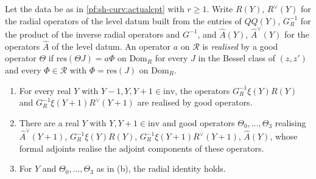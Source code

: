 \begin{proposition}\label{pf:sh-curv:spec}
Let the data be as in \cref{pf:sh-curv:actualcpt} with $r\ge1$. Write $R(Y)$, $R^\vee(Y)$ for the radial operators of the
level datum built from the entries of $QQ(Y)$, $G_R^{-1}$ for the product of the inverse radial operators and $G^{-1}$, and
$\widehat A(Y)$, $\widehat A^\vee(Y)$ for the operators $\widehat A$ of the level datum. An operator $a$ on $\mathcal R$ is
\emph{realised} by a good operator $\Theta$ if $\mathrm{res}(\Theta J)=a\Phi$ on $\mathrm{Dom}_R$ for every $J$ in the Bessel
class of $(z,z')$ and every $\Phi\in\mathcal R$ with $\Phi=\mathrm{res}(J)$ on $\mathrm{Dom}_R$.
\begin{enumerate}[label=(\alph*)]
\item For every real $Y$ with $Y-1,Y,Y+1\in\mathrm{inv}$, the operators $G_R^{-1}\xi(Y)R(Y)$ and
$G_R^{-1}\xi(Y+1)R^\vee(Y+1)$ are realised by good operators.
\item There are a real $Y$ with $Y,Y+1\in\mathrm{inv}$ and good operators $\Theta_0,\dots,\Theta_3$ realising
$\widehat A^\vee(Y+1)$, $G_R^{-1}\xi(Y)R(Y)$, $G_R^{-1}\xi(Y+1)R^\vee(Y+1)$, $\widehat A(Y)$, whose formal adjoints realise the
adjoint components of these operators.
\item For $Y$ and $\Theta_0,\dots,\Theta_3$ as in (b), the radial identity holds.
\end{enumerate}
\end{proposition}

